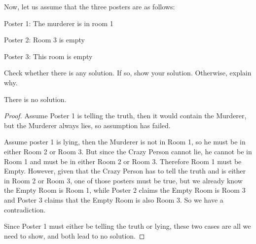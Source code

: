 \documentclass[12pt]{article}
\newenvironment{problem}[2][Problem]{\begin{trivlist}
\item[\hskip \labelsep {\bfseries #1}\hskip \labelsep {\bfseries #2.}]}{\end{trivlist}}
\begin{document}
\begin{problem}{statement 2}
Now, let us assume that the three posters are as follows:

Poster 1: The murderer is in room 1

Poster 2: Room 3 is empty

Poster 3: This room is empty
\end{problem}

\begin{problem}{3}
Check whether there is any solution.
If so, show your solution. Otherwise, explain why.

There is no solution.
\end{problem}

\begin{proof}
Assume Poster 1 is telling the truth, then it would contain the Murderer, but the Murderer always lies, so assumption has failed. 

Assume poster 1 is lying, then the Murderer is not in Room 1, so he must be in either Room 2 or Room 3. But since the Crazy Person cannot lie, he cannot be in Room 1 and must be in either Room 2 or Room 3. Therefore Room 1 must be Empty. However, given that the Crazy Person has to tell the truth and is either in Room 2 or Room 3, one of those posters must be true, but we already know the Empty Room is Room 1, while Poster 2 claims the Empty Room is Room 3 and Poster 3 claims that the Empty Room is also Room 3. So we have a contradiction.

Since Poster 1 must either be telling the truth or lying, these two cases are all we need to show, and both lead to no solution.
\end{proof}

\end{document}
